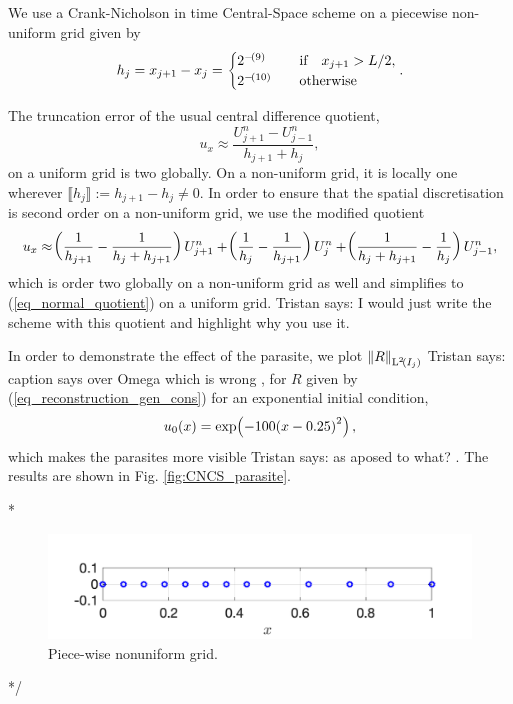 \documentclass[final]{amsart}
\newcommand{\tristan}[1]{{\color{purple} Tristan says:  #1 }}
\numberwithin{equation}{section}
\begin{document}
We use a Crank-Nicholson in time Central-Space scheme on a piecewise
non-uniform grid given by
\begin{equation}\label{eq_grid_spacing_piecewise_nonu}
  h_j=x_{j+1}-x_j= \begin{cases}
    2^{-\!\left({9}\right)} \quad&\text{if}\quad x_{j+1}>L/2,\\
    2^{-\!\left({10}\right)}\quad&\text{otherwise}
  \end{cases}.
\end{equation}


\begin{Rem}\label{rem_central_truncation}
  The truncation error of the usual central difference quotient,
  \begin{equation}\label{eq_normal_quotient}
    u_x\approx \frac{U^n_{j+1}-U^n_{j-1}}{h_{j+1}+h_{j}},
  \end{equation}
  on a uniform grid is two globally. On a non-uniform grid, it is locally one wherever $\llbracket h_j\rrbracket:= h_{j+1}-h_{j}\neq 0$.  In order to ensure that the spatial discretisation is second order on a non-uniform grid, we use the modified  quotient 
  \begin{equation}\label{eq_modified_quotient}
    u_x \approx \!\left({\frac{1}{h_{j+1}} - \frac{1}{h_j+h_{j+1} } }\right)U^n_{j+1} + 
    \!\left({\frac{1}{h_{j}} - \frac{1}{h_{j+1} } }\right)U^n_{j} +
    \!\left({\frac{1}{h_j+h_{j+1} } -\frac{1}{h_{j}} }\right)U^n_{j-1},
  \end{equation}
  which is order two globally on a non-uniform grid as well and
  simplifies to (\ref{eq_normal_quotient}) on a uniform
  grid. \tristan{I would just write the scheme with this quotient and
    highlight why you use it.}
\end{Rem}
In order to demonstrate the effect of the parasite, we plot
$\left\|R\right\|_{\operatorname L^{2}\!\left({I_j}\right)}$ \tristan{caption says over Omega which is
  wrong}, for $R$ given by (\ref{eq_reconstruction_gen_cons}) for an
exponential initial condition,
\begin{equation}\label{eq_ic_parasites}
  u_0\!\left({x}\right)=\exp\!\left({-100\!\left({x-0.25}\right)^2}\right),
\end{equation}
which makes the parasites more visible \tristan{as aposed to what?}.
The results are shown in Fig. \ref{fig:CNCS_parasite}.

\/*
\begin{figure}[H]
	\centering
	\centering
	\includegraphics[scale=.5]{../figures/fig_grid_piecewise_nonu_2}	
	\caption{Piece-wise nonuniform grid.}
	\label{fig_grid_piecewise_nonu}
\end{figure}
*/
\end{document}
